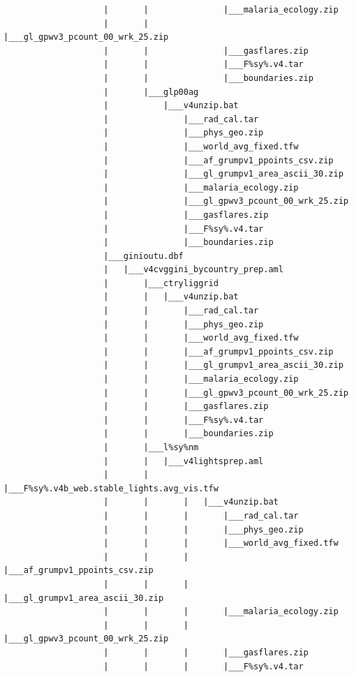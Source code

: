 \documentclass[]{book}
\begin{document}
\begin{verbatim}
                    |       |               |___malaria_ecology.zip
                    |       |               |___gl_gpwv3_pcount_00_wrk_25.zip
                    |       |               |___gasflares.zip
                    |       |               |___F%sy%.v4.tar
                    |       |               |___boundaries.zip
                    |       |___glp00ag
                    |           |___v4unzip.bat
                    |               |___rad_cal.tar
                    |               |___phys_geo.zip
                    |               |___world_avg_fixed.tfw
                    |               |___af_grumpv1_ppoints_csv.zip
                    |               |___gl_grumpv1_area_ascii_30.zip
                    |               |___malaria_ecology.zip
                    |               |___gl_gpwv3_pcount_00_wrk_25.zip
                    |               |___gasflares.zip
                    |               |___F%sy%.v4.tar
                    |               |___boundaries.zip
                    |___ginioutu.dbf
                    |   |___v4cvggini_bycountry_prep.aml
                    |       |___ctryliggrid
                    |       |   |___v4unzip.bat
                    |       |       |___rad_cal.tar
                    |       |       |___phys_geo.zip
                    |       |       |___world_avg_fixed.tfw
                    |       |       |___af_grumpv1_ppoints_csv.zip
                    |       |       |___gl_grumpv1_area_ascii_30.zip
                    |       |       |___malaria_ecology.zip
                    |       |       |___gl_gpwv3_pcount_00_wrk_25.zip
                    |       |       |___gasflares.zip
                    |       |       |___F%sy%.v4.tar
                    |       |       |___boundaries.zip
                    |       |___l%sy%nm
                    |       |   |___v4lightsprep.aml
                    |       |       |___F%sy%.v4b_web.stable_lights.avg_vis.tfw
                    |       |       |   |___v4unzip.bat
                    |       |       |       |___rad_cal.tar
                    |       |       |       |___phys_geo.zip
                    |       |       |       |___world_avg_fixed.tfw
                    |       |       |       |___af_grumpv1_ppoints_csv.zip
                    |       |       |       |___gl_grumpv1_area_ascii_30.zip
                    |       |       |       |___malaria_ecology.zip
                    |       |       |       |___gl_gpwv3_pcount_00_wrk_25.zip
                    |       |       |       |___gasflares.zip
                    |       |       |       |___F%sy%.v4.tar

\end{verbatim}
\end{document}
